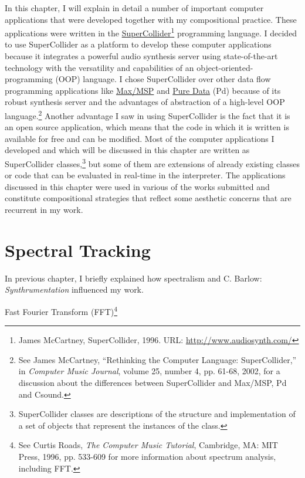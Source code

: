 In this chapter, I will explain in detail a number of important computer applications that were developed together with my compositional practice. These applications were written in the \href{http://supercollider.sourceforge.net/}{\mbox{SuperCollider}}\footnote{James McCartney, SuperCollider, 1996. URL: \href{http://www.audiosynth.com/}{http://www.audiosynth.com/}} programming language. I decided to use SuperCollider as a platform to develop these computer applications because it integrates a powerful audio synthesis server using state-of-the-art technology with the versatility and capabilities of an object-oriented-programming (OOP) language. I chose SuperCollider over other data flow programming applications like \href{http://www.cycling74.com/}{Max/MSP} and \href{http://puredata.info/}{Pure Data} (Pd) because of its robust synthesis server and the advantages of abstraction of a high-level OOP language.\footnote{See James McCartney, ``Rethinking the Computer Language: SuperCollider,'' in \emph{Computer Music Journal}, volume 25, number 4, pp. 61-68, 2002, for a discussion about the differences between SuperCollider and Max/MSP, Pd and Csound.} Another advantage I saw in using SuperCollider is the fact that it is an open source application, which means that the code in which it is written is available for free and can be modified. Most of the computer applications I developed and which will be discussed in this chapter are written as SuperCollider classes,\footnote{SuperCollider classes are descriptions of the structure and implementation of a set of objects that represent the instances of the class.} but some of them are extensions of already existing classes or code that can be evaluated in real-time in the interpreter. The applications discussed in this chapter were used in various of the works submitted and constitute compositional strategies that reflect some aesthetic concerns that are recurrent in my work.

\section{Spectral Tracking}

In previous chapter, I briefly explained how spectralism and C. Barlow: \emph{Synthrumentation} influenced my work.

Fast Fourier Transform (FFT)\footnote{See Curtis Roads, \emph{The Computer Music Tutorial}, Cambridge, MA: MIT Press, 1996, pp. 533-609 for more information about spectrum analysis, including FFT.}


